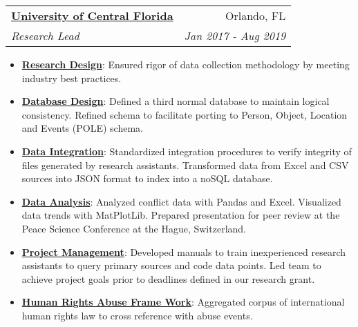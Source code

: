 \documentclass[letterpaper,11pt]{article}
\makeatletter
\newcommand{\resumeItem}[2]{
  \item\small{
    \textbf{#1}{: #2 \vspace{-2pt}}
  }
}
\newcommand{\resumeSubheading}[4]{
  \vspace{-1pt}\item
    \begin{tabular*}{0.97\textwidth}[t]{l@{\extracolsep{\fill}}r}
      \textbf{#1} & #2 \\
      \textit{\small#3} & \textit{\small #4} \\
    \end{tabular*}\vspace{-5pt}
}
\newcommand{\resumeSubSubheading}[2]{
    \begin{tabular*}{0.97\textwidth}{l@{\extracolsep{\fill}}r}
      \textit{\small#1} & \textit{\small #2} \\
    \end{tabular*}\vspace{-5pt}
}
\newcommand{\resumeSubHeadingListEnd}{\end{itemize}}
\newcommand{\resumeItemListStart}{\begin{itemize}}
\newcommand{\resumeItemListEnd}{\end{itemize}\vspace{-5pt}}
\makeatother
\begin{document}

    \resumeSubheading
      {\href{https://docs.jnapolitano.io/parts/resume/work-history/docs/ucf.html}{University of Central Florida}}{Orlando, FL}
      {Research Lead}{Jan 2017 - Aug 2019}
      \resumeItemListStart
        \resumeItem{\href{https://docs.jnapolitano.io/parts/analysis/political-analysis/terrorism-conflict/project-turkish-kurdish/pdf.htm}{Research Design}}
          {Ensured rigor of data collection methodology by meeting industry best practices.}
        \resumeItem{\href{https://docs.jnapolitano.io/parts/analysis/political-analysis/terrorism-conflict/project-turkish-kurdish/database_schema.html}{Database Design}}
          {Defined a third normal database to maintain logical consistency.  Refined schema to facilitate porting to Person, Object, Location and Events (POLE) schema.}
        \resumeItem{\href{https://docs.jnapolitano.io/parts/data/data-integration/index.html}{Data Integration}}
          {Standardized integration procedures to verify integrity of files generated by research assistants. Transformed data from Excel and CSV sources into JSON format to index into a noSQL database.}
        \resumeItem{\href{https://docs.jnapolitano.io/parts/analysis/political-analysis/terrorism-conflict/project-turkish-kurdish/analysis.html}{Data Analysis}}
          {Analyzed conflict data with Pandas and Excel.  Visualized data trends with MatPlotLib.  Prepared presentation for peer review at the Peace Science Conference at the Hague, Switzerland.}
        \resumeItem{\href{https://docs.jnapolitano.io/parts/analysis/political-analysis/terrorism-conflict/project-turkish-kurdish/pdf.html}{Project Management}}
          {Developed manuals to train inexperienced research assistants to query primary sources and code data points.  Led team to achieve project goals prior to deadlines defined in our research grant.}
        \resumeItem{\href{https://docs.jnapolitano.io/parts/analysis/political-analysis/human-rights-law/index.html}{Human Rights Abuse Frame Work}}
          {Aggregated corpus of international human rights law to cross reference with abuse events.}
    \resumeItemListEnd
\end{document}
